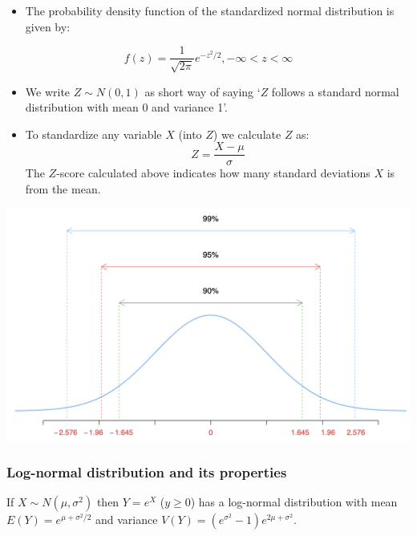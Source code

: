\documentclass[
]{article}
\providecommand{\tightlist}{%
  \setlength{\itemsep}{0pt}\setlength{\parskip}{0pt}}
\begin{document}
\begin{itemize}
\tightlist
\item
  The probability density function of the standardized normal
  distribution is given by:
\end{itemize}

\[f (z) = \frac{1}{\sqrt{2\pi}} e^{-z^2/2}, -\infty<z<\infty\]

\begin{itemize}
\item
  We write \(Z \sim N(0,1)\) as short way of saying `\(Z\) follows a
  standard normal distribution with mean 0 and variance 1'.
\item
  To standardize any variable \(X\) (into \(Z\)) we calculate \(Z\) as:
  \[ Z = \frac{X - \mu} { \sigma}\] The \(Z\)-score calculated above
  indicates how many standard deviations \(X\) is from the mean.
\end{itemize}

\begin{center}\includegraphics[width=1\linewidth,height=1\textheight]{snormdist2} \end{center}

\hypertarget{log-normal-distribution-and-its-properties}{%
\subsubsection{Log-normal distribution and its
properties}\label{log-normal-distribution-and-its-properties}}

If \(X\sim N(\mu, \sigma^2)\) then \(Y=e^X\) (\(y \geq 0\)) has a
log-normal distribution with mean \(E(Y)=e^{\mu+\sigma^2/2}\) and
variance \(V(Y)=(e^{\sigma^2}-1)e^{2\mu+\sigma^2}\).
\end{document}
